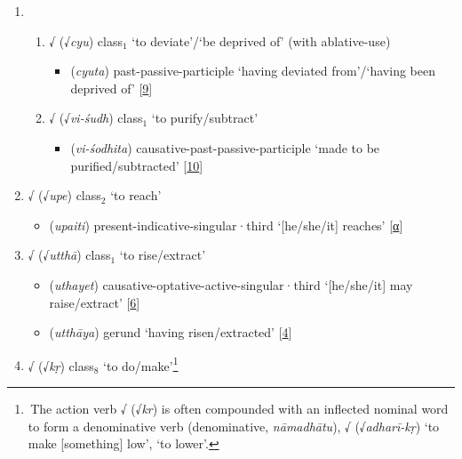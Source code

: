 \begin{enumerate}
\begin{enumerate}
\begin{itemize}
        \end{itemize}
        \end{enumerate}
\item \begin{enumerate}
    \item  √ (√\textit{cyu}) \acrshort{class}$_\text{1}$  `to deviate'/`be deprived of' (with \acrshort{ablative}-use)
    \begin{itemize}
        \item {} (\textit{cyuta}) \acrshort{past}-\acrshort{passive}-\acrshort{participle} `having deviated from'/`having been deprived of' [\hyperlink{Spass9}{9}]
    \end{itemize}
    \item √ (√\textit{vi-śudh}) \acrshort{class}$_\text{1}$  `to purify/subtract' 
    \begin{itemize}
    \item {} (\textit{vi-śodhita})  \acrshort{causative}-\acrshort{past}-\acrshort{passive}-\acrshort{participle} `made to be purified/subtracted' [\hyperlink{Spass10}{10}]
    \end{itemize}
    \end{enumerate}        
\item √ (√\textit{upe}) \acrshort{class}$_\text{2}$ `to reach'
    \begin{itemize}
        \item {} (\textit{upaiti}) \acrshort{present}-\acrshort{indicative}-\acrshort{singular}·\acrshort{third} `[he/she/it] reaches' [\hyperlink{SpassA}{α}]
    \end{itemize}
\item √ (√\textit{utthā}) \acrshort{class}$_\text{1}$ `to rise/extract'
    \begin{itemize}
        \item {} (\textit{uthayet}) \acrshort{causative}-\acrshort{optative}-\acrshort{active}-\acrshort{singular}·\acrshort{third} `[he/she/it] may raise/extract' [\hyperlink{Spass6}{6}]
        \item {} (\textit{utthāya}) \acrshort{gerund} `having risen/extracted' [\hyperlink{Spass4}{4}]
    \end{itemize}    
\item √ (√\textit{kṛ}) \acrshort{class}$_\text{8}$  `to do/make'\footnote{\,The action verb √ (√\textit{kr}) is often compounded with an inflected nominal word to form a denominative verb (\acrshort{denominative}, \textit{nāmadhātu}), \eg √ (√\textit{adharī-kṛ}) `to make [something] low', \ie `to lower'.}

\end{enumerate}
